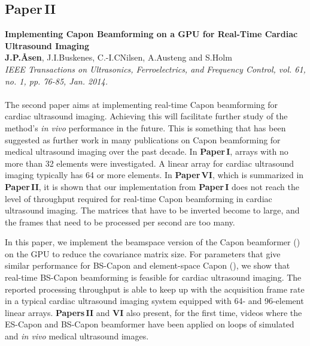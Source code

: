 \subsection{Paper\,II}
\textbf{Implementing Capon Beamforming on a GPU for Real-Time Cardiac Ultrasound Imaging}\\
\textbf{J.\:P.\:\AA{}sen}, J.\:I.\:Buskenes, C.-I.\:C\:Nilsen, A.\:Austeng and S.\:Holm\\
{\it IEEE Transactions on Ultrasonics, Ferroelectrics, and Frequency Control, vol. 61, no. 1, pp. 76-85, Jan. 2014.}\\\\
The second paper aims at implementing real-time Capon beamforming for cardiac ultrasound imaging. Achieving this will facilitate further study of the method's \textit{in vivo} performance in the future. This is something that has been suggested as further work in many publications on Capon beamforming for medical ultrasound imaging over the past decade. In \textbf{Paper\,I}, arrays with no more than 32 elements were investigated. A linear array for cardiac ultrasound imaging typically has 64 or more elements. In \textbf{Paper\,VI}, which is summarized in \textbf{Paper\,II}, it is shown that our implementation from  \textbf{Paper\,I} does not reach the level of throughput required for real-time Capon beamforming in cardiac ultrasound imaging. The matrices that have to be inverted become to large, and the frames that need to be processed per second are too many.

In this paper, we implement the beamspace version of the Capon beamformer () on the GPU  to reduce the covariance matrix size. For parameters that give similar performance for BS-Capon and element-space Capon (), we show that real-time BS-Capon beamforming is feasible for cardiac ultrasound imaging. The reported processing throughput is able to keep up with the acquisition frame rate in a typical cardiac ultrasound imaging system equipped with 64- and 96-element linear arrays.  \textbf{Papers\,II} and \textbf{VI} also present, for the first time, videos where the ES-Capon and BS-Capon beamformer have been applied on loops of simulated and \textit{in vivo} medical ultrasound images.

